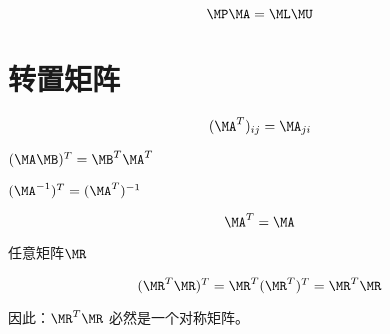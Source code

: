 $$\MP\MA = \ML\MU$$

\section{转置矩阵}


$$(\MA^T)_{ij} = \MA_{ji}$$


\begin{ul}
 \item $(\MA\MB)^T = \MB^T \MA^T$
 \item $(\MA^{-1})^T = (\MA^T)^{-1}$
\end{ul}



$$\MA^T = \MA$$

任意矩阵$\MR$

$$(\MR^T \MR)^T = \MR^T(\MR^T)^T = \MR^T\MR$$

因此：$\MR^T \MR$ 必然是一个对称矩阵。

